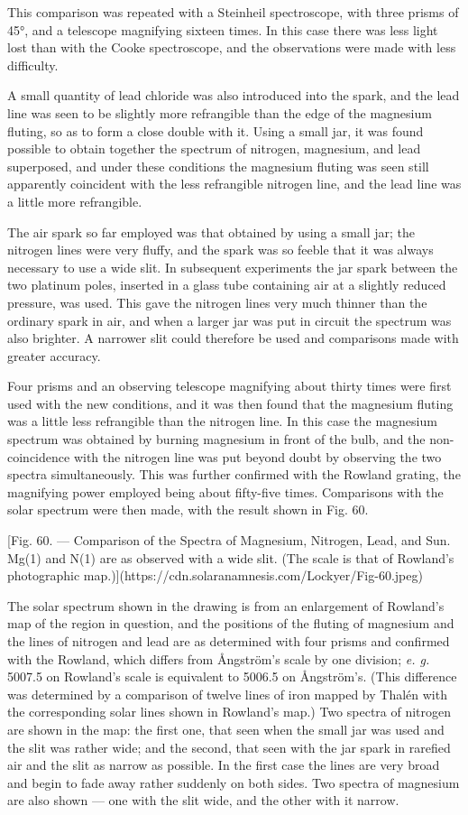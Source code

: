 \documentclass[a4paper, 12pt, oneside, polutonikogreek, english]{article}
\begin{document}
This comparison was repeated with a Steinheil spectroscope, with three prisms of 45°, and a telescope magnifying sixteen times. In this case there was less light lost than with the Cooke spectroscope, and the observations were made with less difficulty.

A small quantity of lead chloride was also introduced into the spark, and the lead line was seen to be slightly more refrangible than the edge of the magnesium fluting, so as to form a close double with it. Using a small jar, it was found possible to obtain together the spectrum of nitrogen, magnesium, and lead superposed, and under these conditions the magnesium fluting was seen still apparently coincident with the less refrangible nitrogen line, and the lead line was a little more refrangible.

The air spark so far employed was that obtained by using a small jar; the nitrogen lines were very fluffy, and the spark was so feeble that it was always necessary to use a wide slit. In subsequent experiments the jar spark between the two platinum poles, inserted in a glass tube containing air at a slightly reduced pressure, was used. This gave the nitrogen lines very much thinner than the ordinary spark in air, and when a larger jar was put in circuit the spectrum was also brighter. A narrower slit could therefore be used and comparisons made with greater accuracy.

Four prisms and an observing telescope magnifying about thirty times were first used with the new conditions, and it was then found that the magnesium fluting was a little less refrangible than the nitrogen line. In this case the magnesium spectrum was obtained by burning magnesium in front of the bulb, and the non-coincidence with the nitrogen line was put beyond doubt by observing the two spectra simultaneously. This was further confirmed with the Rowland grating, the magnifying power employed being about fifty-five times. Comparisons with the solar spectrum were then made, with the result shown in Fig. 60.

[Fig. 60. --- Comparison of the Spectra of Magnesium, Nitrogen, Lead, and Sun. Mg(1) and N(1) are as observed with a wide slit. (The scale is that of Rowland's photographic map.)](https://cdn.solaranamnesis.com/Lockyer/Fig-60.jpeg)

The solar spectrum shown in the drawing is from an enlargement of Rowland's map of the region in question, and the positions of the fluting of magnesium and the lines of nitrogen and lead are as determined with four prisms and confirmed with the Rowland, which differs from Ångström's scale by one division; \emph{e. g.} 5007.5 on Rowland's scale is equivalent to 5006.5 on Ångström's. (This difference was determined by a comparison of twelve lines of iron mapped by Thalén with the corresponding solar lines shown in Rowland's map.) Two spectra of nitrogen are shown in the map: the first one, that seen when the small jar was used and the slit was rather wide; and the second, that seen with the jar spark in rarefied air and the slit as narrow as possible. In the first case the lines are very broad and begin to fade away rather suddenly on both sides. Two spectra of magnesium are also shown --- one with the slit wide, and the other with it narrow.
\end{document}
